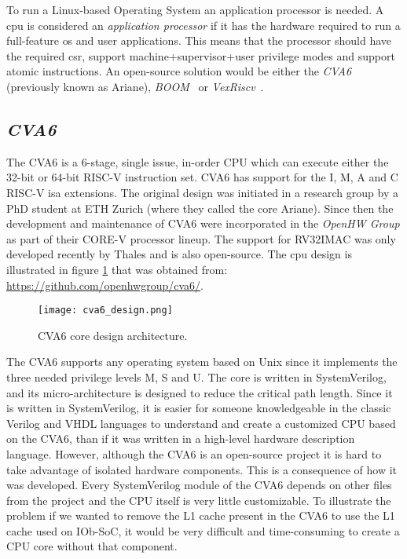 To run a Linux-based Operating System an application processor is needed. A \acrshort{cpu} is considered an \textit{application processor} if it has the hardware required to run a full-feature \acrfull{os} and user applications. This means that the processor should have the required \acrfull{csr}, support \acrshort{machine}+\acrshort{supervisor}+\acrshort{user} privilege modes and support atomic instructions. An open-source solution would be either the \textit{CVA6}~\cite{zaruba2019cost} (previously known as Ariane), \textit{BOOM}~\cite{zhaosonicboom} or \textit{VexRiscv}~\cite{vexriscv}.

\subsection{\textit{CVA6}}
The CVA6 is a 6-stage, single issue, in-order CPU which can execute either the 32-bit or 64-bit RISC-V instruction set. CVA6 has support for the I, M, A and C RISC-V \acrshort{isa} extensions. The original design was initiated in a research group by a PhD student at ETH Zurich (where they called the core Ariane). Since then the development and maintenance of CVA6 were incorporated in the \textit{OpenHW Group} as part of their CORE-V processor lineup. The support for RV32IMAC was only developed recently by Thales and is also open-source. The \acrshort{cpu} design is illustrated in figure \ref{fig:cva6_design} that was obtained from: \url{https://github.com/openhwgroup/cva6/}.

\begin{figure}[!h]
    \centering
    \texttt{[image: cva6\_design.png]}
    \caption{CVA6 core design architecture.}
    \label{fig:cva6_design}
\end{figure}

The CVA6 supports any operating system based on Unix since it implements the three needed privilege levels M, S and U. The core is written in SystemVerilog, and its micro-architecture is designed to reduce the critical path length. Since it is written in SystemVerilog, it is easier for someone knowledgeable in the classic Verilog and VHDL languages to understand and create a customized CPU based on the CVA6, than if it was written in a high-level hardware description language. However, although the CVA6 is an open-source project it is hard to take advantage of isolated hardware components. This is a consequence of how it was developed. Every SystemVerilog module of the CVA6 depends on other files from the project and the CPU itself is very little customizable. To illustrate the problem if we wanted to remove the L1 cache present in the CVA6 to use the L1 cache used on IOb-SoC, it would be very difficult and time-consuming to create a CPU core without that component.

